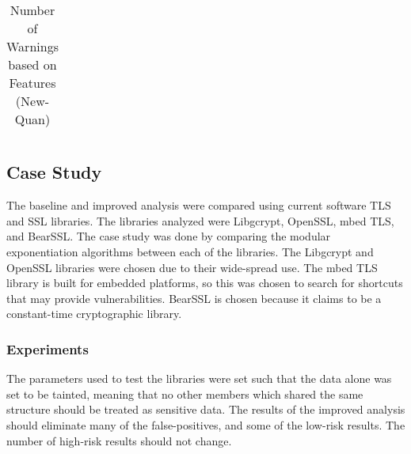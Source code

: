 \begin{table*}
  \centering
    \begin{tabular}{@{}lrrrrrrrrrrr@{}}

    

    \end{tabular}
  \caption{Number of Warnings based on Features (New-Quan)}
  \label{tbl:overall-feature-benchmark-new-quan}
\end{table*}

\subsection{Case Study}

The baseline and improved analysis were compared using current software TLS and
SSL libraries. The libraries analyzed were Libgcrypt, OpenSSL, mbed TLS, and
BearSSL. The case study was done by comparing the modular exponentiation
algorithms between each of the libraries. The Libgcrypt and OpenSSL libraries
were chosen due to their wide-spread use. The mbed TLS library is built for
embedded platforms, so this was chosen to search for shortcuts that may provide
vulnerabilities. BearSSL is chosen because it claims to be a constant-time
cryptographic library.

\subsubsection{Experiments}
The parameters used to test the libraries were set such that the data alone was
set to be tainted, meaning that no other members which shared the same structure
should be treated as sensitive data. The results of the improved analysis should
eliminate many of the false-positives, and some of the low-risk results. The
number of high-risk results should not change.

